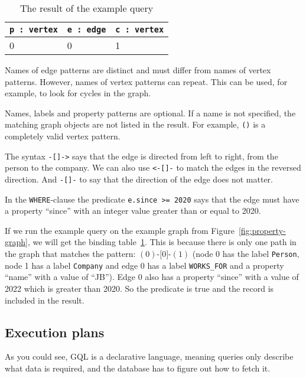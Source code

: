 \documentclass[14pt]{constructor-thesis}
\theoremstyle{definition}
\newcommand{\pathstart}[1]{(#1)}
\newcommand{\pathhop}[3]{#1 \texttt{-[} #2 \texttt{]-} (#3)}
\begin{document}
\begin{table}[b]
  \centering
  
  \begin{tabular}{ |p{3cm}|p{3cm}|p{3cm}|  }
    \hline
    \texttt{p : vertex} & \texttt{e : edge} & \texttt{c : vertex} \\
    \hline
    0 & 0 & 1 \\
    \hline
  \end{tabular}

  \caption{The result of the example query}
  \label{tab:example-query-binding-table}
\end{table}

Names of edge patterns are distinct and must differ from names of vertex patterns. However, names of vertex patterns can repeat. This can be used, for example, to look for cycles in the graph.

Names, labels and property patterns are optional. If a name is not specified, the matching graph objects are not listed in the result. For example, \texttt{()} is a completely valid vertex pattern.

The syntax \texttt{-[]->} says that the edge is directed from left to right, from the person to the company. We can also use \texttt{<-[]-} to match the edges in the reversed direction. And \texttt{-[]-} to say that the direction of the edge does not matter.

In the \texttt{WHERE}-clause the predicate \verb+e.since >= 2020+ says that the edge must have a property ``since'' with an integer value greater than or equal to 2020.


If we run the example query on the example graph from Figure~\ref{fig:property-graph}, we will get the binding table~\ref{tab:example-query-binding-table}. This is because there is only one path in the graph that matches the pattern: $\pathhop{\pathstart{0}}{0}{1}$ (node 0 has the label \texttt{Person}, node 1 has a label \texttt{Company} and edge 0 has a label \texttt{WORKS\_FOR} and a property ``name'' with a value of ``JB''). Edge 0 also has a property ``since'' with a value of 2022 which is greater than 2020. So the predicate is true and the record is included in the result.

\subsection{Execution plans}

As you could see, GQL is a declarative language, meaning queries only describe what data is required, and the database has to figure out how to fetch it.
\end{document}

